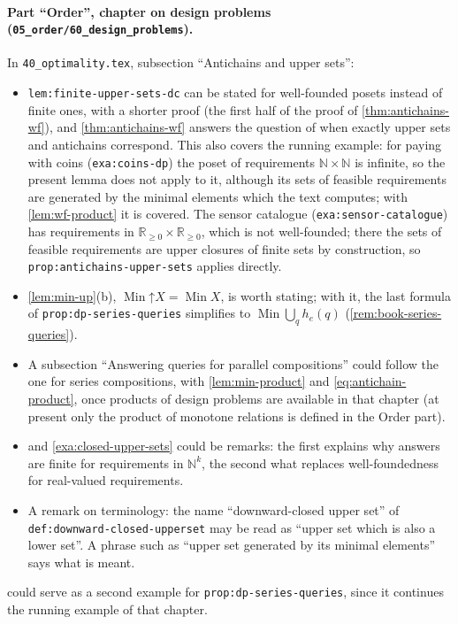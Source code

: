 \documentclass[11pt,a4paper]{article}
\theoremstyle{plain}
\theoremstyle{definition}
\theoremstyle{remark}
\newcommand{\up}{\mathord{\uparrow}}
\DeclareMathOperator{\Min}{Min}
\newcommand{\N}{\mathbb{N}}
\newcommand{\Rp}{\mathbb{R}_{\geq 0}}
\newcommand{\lbl}[1]{\nolinkurl{#1}}
\newcommand{\file}[1]{\nolinkurl{#1}}
\begin{document}
\paragraph{Part ``Order'', chapter on design problems (\file{05_order/60_design_problems}).}
In \file{40_optimality.tex}, subsection ``Antichains and upper sets'':
\begin{itemize}
    \item \lbl{lem:finite-upper-sets-dc} can be stated for well-founded posets instead of finite ones, with a shorter proof (the first half of the proof of \cref{thm:antichains-wf}), and \cref{thm:antichains-wf} answers the question of when exactly upper sets and antichains correspond.
          This also covers the running example: for paying with coins (\lbl{exa:coins-dp}) the poset of requirements $\N \times \N$ is infinite, so the present lemma does not apply to it, although its sets of feasible requirements are generated by the minimal elements which the text computes; with \cref{lem:wf-product} it is covered.
          The sensor catalogue (\lbl{exa:sensor-catalogue}) has requirements in $\Rp \times \Rp$, which is not well-founded; there the sets of feasible requirements are upper closures of finite sets by construction, so \lbl{prop:antichains-upper-sets} applies directly.
    \item \cref{lem:min-up}(b), $\Min \up X = \Min X$, is worth stating; with it, the last formula of \lbl{prop:dp-series-queries} simplifies to $\Min \bigcup_{q} h_e(q)$ (\cref{rem:book-series-queries}).
    \item A subsection ``Answering queries for parallel compositions'' could follow the one for series compositions, with \cref{lem:min-product} and \cref{eq:antichain-product}, once products of design problems are available in that chapter (at present only the product of monotone relations is defined in the Order part).
    \item {} and \cref{exa:closed-upper-sets} could be remarks: the first explains why answers are finite for requirements in $\N^k$, the second what replaces well-foundedness for real-valued requirements.
    \item A remark on terminology: the name ``downward-closed upper set'' of \lbl{def:downward-closed-upperset} may be read as ``upper set which is also a lower set''. A phrase such as ``upper set generated by its minimal elements'' says what is meant.
\end{itemize}
 could serve as a second example for \lbl{prop:dp-series-queries}, since it continues the running example of that chapter.
\end{document}
